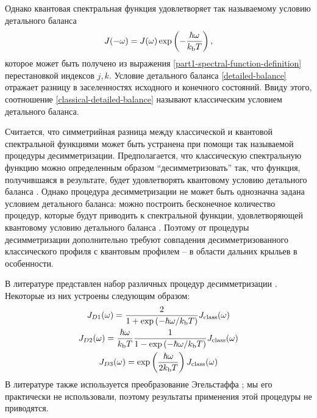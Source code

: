 Однако квантовая спектральная функция удовлетворяет так называемому условию детального баланса \cite{frommhold} 
\begin{gather}
    J(-\omega) = J(\omega) \exp \left( -\frac{\hbar \omega}{k_\text{b} T} \right), \label{detailed-balance}
\end{gather}
%
которое может быть получено из выражения \eqref{part1-spectral-function-definition} перестановкой индексов $j, k$. Условие детального баланса \eqref{detailed-balance} отражает разницу в заселенностях исходного и конечного состояний. Ввиду этого, соотношение \eqref{classical-detailed-balance} называют классическим условием детального баланса. \par
Считается, что симметрийная разница между классической и квантовой спектральной функциями может быть устранена при помощи так называемой процедуры десимметризации. Предполагается, что классическую спектральную функцию можно определенным образом \enquote{десимметризовать} так, что функция, получившаяся в результате, будет удовлетворять квантовому условию детального баланса \cite{borysow1985phenomena}. Однако процедура десимметризации не может быть однозначна задана условием детального баланса: можно построить бесконечное количество процедур, которые будут приводить к спектральной функции, удовлетворяющей квантовому условию детального баланса \cite{frommhold}. Поэтому от процедуры десимметризации дополнительно требуют совпадения десимметризованного классического профиля с квантовым профилем -- в области дальних крыльев в особенности. \par
В литературе представлен набор различных процедур десимметризации \cite{borysow1985}. Некоторые из них устроены следующим образом:
\begin{gather}
    J_{D1}(\omega) = \frac{2}{1 + \exp \left( -\hbar \omega / k_\text{b} T \right)} J_\text{class}(\omega)  \\
    J_{D2}(\omega) = \frac{\hbar \omega}{k_\text{b} T} \frac{1}{1 - \exp \left( -\hbar \omega / k_\text{b} T \right)} J_\text{class}(\omega) \\
    J_{D3}(\omega) = \exp \left( \frac{\hbar \omega}{2 k_\text{b} T} \right) J_\text{class}(\omega)
\end{gather}
В литературе также используется преобразование Эгельстаффа \cite{egelstaff1962}; мы его практически не использовали, поэтому результаты применения этой процедуры не приводятся. 

